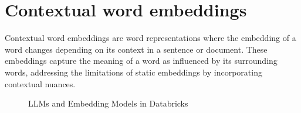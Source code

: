 \documentclass[letterpaper,11pt,english]{sphinxmanual}
\begin{document}
\begin{sphinxVerbatim}[commandchars=\\\{\}]
     \PYG{p}{]}
\PYG{p}{[}       
        \PYG{p}{]}\PYG{p}{]}
          
\end{sphinxVerbatim}


\section{Contextual word embeddings}
\label{\detokenize{embedding:contextual-word-embeddings}}
\sphinxAtStartPar
Contextual word embeddings are word representations where the embedding of a word
changes depending on its context in a sentence or document. These embeddings capture
the meaning of a word as influenced by its surrounding words, addressing the limitations
of static embeddings by incorporating contextual nuances.

\begin{figure}[htbp]
\centering
\capstart

\noindent{}
\caption{LLMs and Embedding Models in Databricks}\label{\detokenize{embedding:id6}}\label{\detokenize{embedding:fig-embedding-databricks}}\end{figure}
\end{document}
